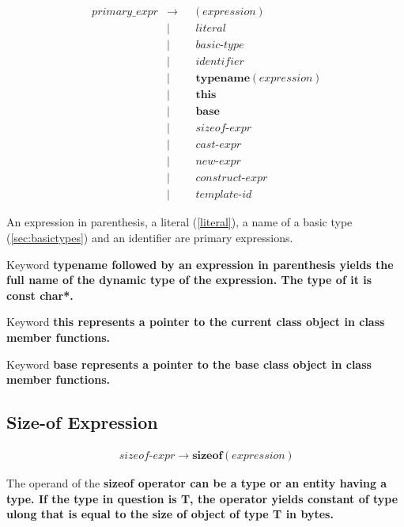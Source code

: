 \documentclass[a4paper,oneside,11pt]{article}
\begin{document}
\begin{align*}
primary\_expr &\rightarrow & &\texttt{(} \> \hyperref[expression]{expression} \> \texttt{)}\\
&| & &\hyperref[literal]{literal}\\
&| & &\hyperref[basictype]{basic\textrm{-}type}\\
&| & &\hyperref[identifier]{identifier}\\
&| & &\textbf{typename} \> \texttt{(} \> \hyperref[expression]{expression} \> \texttt{)}\\
&| & &\textbf{this}\\
&| & &\textbf{base}\\
&| & &\hyperref[sizeof]{sizeof\textrm{-}expr}\\
&| & &\hyperref[cast]{cast\textrm{-}expr}\\
&| & &\hyperref[new]{new\textrm{-}expr}\\
&| & &\hyperref[construct]{construct\textrm{-}expr}\\
&| & &\hyperref[templateid]{template\textrm{-}id}
\end{align*}

An expression in parenthesis, a literal (\ref{literal}), a name of a basic type (\ref{sec:basictypes}) and an identifier are primary expressions.

Keyword \bf{typename} followed by an expression in parenthesis yields the full name of the dynamic type of the expression.
The type of it is \bf{const char*}.

Keyword \bf{this} represents a pointer to the current class object in class member functions.

Keyword \bf{base} represents a pointer to the base class object in class member functions.

\subsection{Size-of Expression}\label{sizeof}

\begin{align*}
sizeof\textrm{-}expr \rightarrow \textbf{sizeof} \> \texttt{(} \> \hyperref[expression]{expression} \> \texttt{)}
\end{align*}

The operand of the \bf{sizeof} operator can be a type or an entity having a type.
If the type in question is T, the operator yields constant of type \bf{ulong} that is equal to the size of object of type T in bytes.
\end{document}
